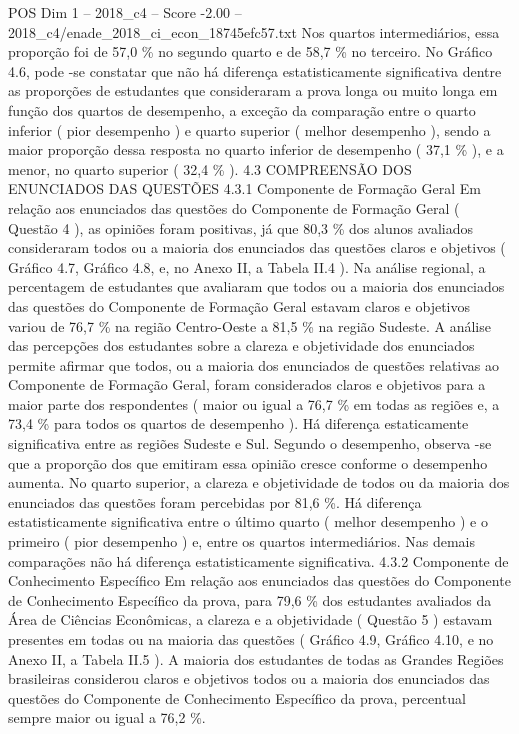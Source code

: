 \begin{textsample}{POS Dim 1 – 2018\_c4 – Score -2.00 – 2018\_c4/enade\_2018\_ci\_econ\_18745efc57.txt}
Nos quartos intermediários, essa proporção foi de 57,0 \% no segundo quarto e de 58,7 \% no terceiro.
No Gráfico 4.6, pode -se constatar que não há diferença estatisticamente significativa dentre as proporções de estudantes que consideraram a prova longa ou muito longa em função dos quartos de desempenho, a exceção da comparação entre o quarto inferior ( pior desempenho ) e quarto superior ( melhor desempenho ), sendo a maior proporção dessa resposta no quarto inferior de desempenho ( 37,1 \% ), e a menor, no quarto superior ( 32,4 \% ). 4.3 COMPREENSÃO DOS ENUNCIADOS DAS QUESTÕES 4.3.1 Componente de Formação Geral Em relação aos enunciados das questões do Componente de Formação Geral ( Questão 4 ), as opiniões foram positivas, já que 80,3 \% dos alunos avaliados consideraram todos ou a maioria dos enunciados das questões claros e objetivos ( Gráfico 4.7, Gráfico 4.8, e, no Anexo II, a Tabela II.4 ).
Na análise regional, a percentagem de estudantes que avaliaram que todos ou a maioria dos enunciados das questões do Componente de Formação Geral estavam claros e objetivos variou de 76,7 \% na região Centro-Oeste a 81,5 \% na região Sudeste.
A análise das percepções dos estudantes sobre a clareza e objetividade dos enunciados permite afirmar que todos, ou a maioria dos enunciados de questões relativas ao Componente de Formação Geral, foram considerados claros e objetivos para a maior parte dos respondentes ( maior ou igual a 76,7 \% em todas as regiões e, a 73,4 \% para todos os quartos de desempenho ).
Há diferença estaticamente significativa entre as regiões Sudeste e Sul.
Segundo o desempenho, observa -se que a proporção dos que emitiram essa opinião cresce conforme o desempenho aumenta.
No quarto superior, a clareza e objetividade de todos ou da maioria dos enunciados das questões foram percebidas por 81,6 \%.
Há diferença estatisticamente significativa entre o último quarto ( melhor desempenho ) e o primeiro ( pior desempenho ) e, entre os quartos intermediários.
Nas demais comparações não há diferença estatisticamente significativa. 4.3.2 Componente de Conhecimento Específico Em relação aos enunciados das questões do Componente de Conhecimento Específico da prova, para 79,6 \% dos estudantes avaliados da Área de Ciências Econômicas, a clareza e a objetividade ( Questão 5 ) estavam presentes em todas ou na maioria das questões ( Gráfico 4.9, Gráfico 4.10, e no Anexo II, a Tabela II.5 ).
A maioria dos estudantes de todas as Grandes Regiões brasileiras considerou claros e objetivos todos ou a maioria dos enunciados das questões do Componente de Conhecimento Específico da prova, percentual sempre maior ou igual a 76,2 \%.

\end{textsample}
